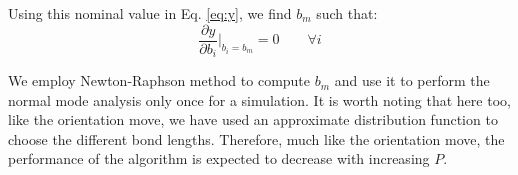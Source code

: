         Using this nominal value in Eq. \eqref{eq:y}, we find $b_m$ such that:
        \begin{equation}
        \label{eq:bm}                
            \displaystyle\frac{\partial y}{\partial b_i} \bigg|_{b_i = b_m} = 0 \qquad \forall i
        \end{equation}

        We employ Newton-Raphson method to compute $b_m$ and use it to perform the normal mode analysis only once for a simulation. It is worth noting that here too, like the orientation move, we have used an approximate distribution function to choose the different bond lengths. Therefore, much like the orientation move, the performance of the algorithm is expected to decrease with increasing $P$.
